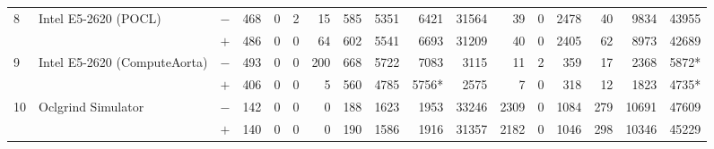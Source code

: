 \begin{tabular}{lll | rrrrrrr | rrrrrrr }
\hline
\multirow{ 2}{*}{8} & \multirow{ 2}{*}{Intel E5-2620 (POCL)} & $-$ & 468 & 0 & 2 & 15 & 585 & 5351 & 6421       & 31564 & 39 & 0 & 2478 & 40 & 9834 & 43955 \\& & $+$ & 486 & 0 & 0 & 64 & 602 & 5541 & 6693 & 31209 & 40 & 0 & 2405 & 62 & 8973 & 42689 \\
\hline
\multirow{ 2}{*}{9} & \multirow{ 2}{*}{Intel E5-2620 (ComputeAorta)} & $-$ & 493 & 0 & 0 & 200 & 668 & 5722 & 7083       & 3115 & 11 & 2 & 359 & 17 & 2368 & 5872* \\& & $+$ & 406 & 0 & 0 & 5 & 560 & 4785 & 5756* & 2575 & 7 & 0 & 318 & 12 & 1823 & 4735* \\
\hline
\multirow{ 2}{*}{10} & \multirow{ 2}{*}{Oclgrind Simulator} & $-$ & 142 & 0 & 0 & 0 & 188 & 1623 & 1953       & 33246 & 2309 & 0 & 1084 & 279 & 10691 & 47609 \\& & $+$ & 140 & 0 & 0 & 0 & 190 & 1586 & 1916 & 31357 & 2182 & 0 & 1046 & 298 & 10346 & 45229 \\
  \bottomrule
\end{tabular}

